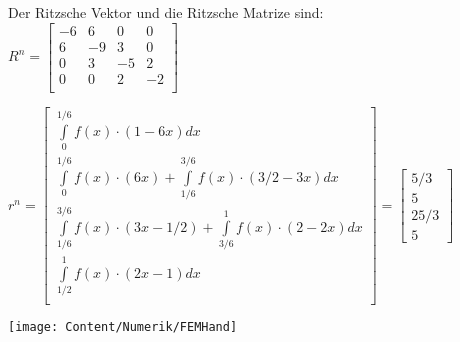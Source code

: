 \begin{minipage}{10cm}
	Der Ritzsche Vektor und die Ritzsche Matrize sind:\\

	$R^n=
		\begin{bmatrix}
			-6 & 6  & 0  & 0  \\
			6  & -9 & 3  & 0  \\
			0  & 3  & -5 & 2  \\
			0  & 0  & 2  & -2 \\
		\end{bmatrix}$

	$
		r^n=\begin{bmatrix}
			\int\limits_{0}^{1/6}{f(x)\cdot(1-6x)}dx                                            \\
			\int\limits_{0}^{1/6}{f(x)\cdot(6x)}+\int\limits_{1/6}^{3/6}{f(x)\cdot(3/2-3x)}dx   \\
			\int\limits_{1/6}^{3/6}{f(x)\cdot(3x-1/2)}+\int\limits_{3/6}^{1}{f(x)\cdot(2-2x)}dx \\
			\int\limits_{1/2}^{1}{f(x)\cdot(2x-1)}dx                                            \\
		\end{bmatrix}=
		\begin{bmatrix}
			5/3  \\
			5    \\
			25/3 \\
			5
		\end{bmatrix}
	$\end{minipage}
\hfill
\begin{minipage}{9cm}
	\texttt{[image: Content/Numerik/FEMHand]}
\end{minipage}\\

